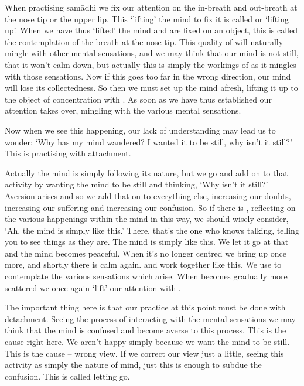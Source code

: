 When practising sam\=adhi we fix our attention on the in-breath and out-breath at the nose tip or the upper lip. This `lifting' the mind to fix it is called  or `lifting up'. When we have thus `lifted' the mind and are fixed on an object, this is called  the contemplation of the breath at the nose tip. This quality of  will naturally mingle with other mental sensations, and we may think that our mind is not still, that it won't calm down, but actually this is simply the workings of  as it mingles with those sensations. Now if this goes too far in the wrong direction, our mind will lose its collectedness. So then we must set up the mind afresh, lifting it up to the object of concentration with . As soon as we have thus established our attention  takes over, mingling with the various mental sensations. 

Now when we see this happening, our lack of understanding may lead us to wonder: `Why has my mind wandered? I wanted it to be still, why isn't it still?' This is practising with attachment. 

Actually the mind is simply following its nature, but we go and add on to that activity by wanting the mind to be still and thinking, `Why isn't it still?' Aversion arises and so we add that on to everything else, increasing our doubts, increasing our suffering and increasing our confusion. So if there is , reflecting on the various happenings within the mind in this way, we should wisely consider, `Ah, the mind is simply like this.' There, that's the one who knows talking, telling you to see things as they are. The mind is simply like this. We let it go at that and the mind becomes peaceful. When it's no longer centred we bring up  once more, and shortly there is calm again.  and  work together like this. We use  to contemplate the various sensations which arise. When  becomes gradually more scattered we once again `lift' our attention with . 

The important thing here is that our practice at this point must be done with detachment. Seeing the process of  interacting with the mental sensations we may think that the mind is confused and become averse to this process. This is the cause right here. We aren't happy simply because we want the mind to be still. This is the cause -- wrong view. If we correct our view just a little, seeing this activity as simply the nature of mind, just this is enough to subdue the confusion. This is called letting go. 


